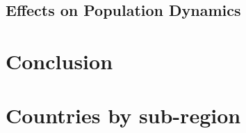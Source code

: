 \documentclass[11pt]{article}
\begin{document}
\subsection{Effects on Population Dynamics}

\section{Conclusion}


\newpage
\clearpage

\setcounter{section}{0}
\renewcommand{\thesection}{Appendix \Alph{section}:}

\section{Countries by sub-region}
\begin{itemize}
    \setlength\itemsep{0pt}
    
\end{itemize}

\clearpage

{\small


}

\clearpage
\end{document}
